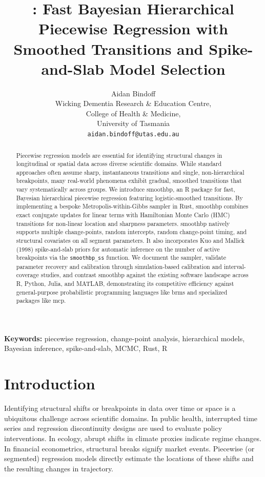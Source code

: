 \documentclass[12pt]{article}
\title{\pkg{smoothbp}: Fast Bayesian Hierarchical Piecewise Regression with Smoothed Transitions and Spike-and-Slab Model Selection}
\author{
  Aidan Bindoff \\[4pt]
  Wicking Dementia Research \& Education Centre, \\
  College of Health \& Medicine, \\
  University of Tasmania \\[4pt]
  \texttt{aidan.bindoff@utas.edu.au}
}
\date{}
\newcommand{\pkg}[1]{\textsf{#1}}
\newcommand{\code}[1]{\texttt{#1}}
\begin{document}
\maketitle

\begin{abstract}
Piecewise regression models are essential for identifying structural changes in longitudinal or spatial data across diverse scientific domains. While standard approaches often assume sharp, instantaneous transitions and single, non-hierarchical breakpoints, many real-world phenomena exhibit gradual, smoothed transitions that vary systematically across groups. We introduce \pkg{smoothbp}, an R package for fast, Bayesian hierarchical piecewise regression featuring logistic-smoothed transitions. By implementing a bespoke Metropolis-within-Gibbs sampler in Rust, \pkg{smoothbp} combines exact conjugate updates for linear terms with Hamiltonian Monte Carlo (HMC) transitions for non-linear location and sharpness parameters. \pkg{smoothbp} natively supports multiple change-points, random intercepts, random change-point timing, and structural covariates on all segment parameters. It also incorporates Kuo and Mallick (1998) spike-and-slab priors for automatic inference on the number of active breakpoints via the \code{smoothbp\_ss} function. We document the sampler, validate parameter recovery and calibration through simulation-based calibration and interval-coverage studies, and contrast \pkg{smoothbp} against the existing software landscape across R, Python, Julia, and MATLAB, demonstrating its competitive efficiency against general-purpose probabilistic programming languages like \pkg{brms} and specialized packages like \pkg{mcp}.
\end{abstract}

\noindent\textbf{Keywords:} piecewise regression, change-point analysis, hierarchical models, Bayesian inference, spike-and-slab, MCMC, Rust, R

\bigskip

\section{Introduction}

Identifying structural shifts or breakpoints in data over time or space is a ubiquitous challenge across scientific domains. In public health, interrupted time series and regression discontinuity designs are used to evaluate policy interventions. In ecology, abrupt shifts in climate proxies indicate regime changes. In financial econometrics, structural breaks signify market events. Piecewise (or segmented) regression models directly estimate the locations of these shifts and the resulting changes in trajectory.
\end{document}
